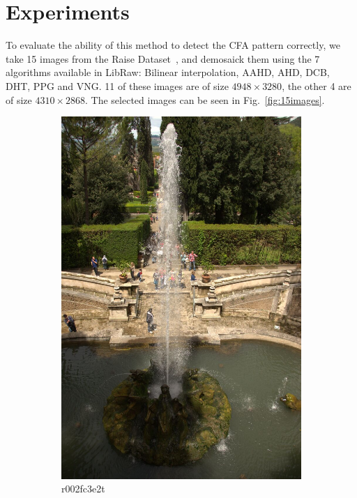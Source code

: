 \documentclass{ipol}
\begin{document}
\clearpage


\iffalse

\section{Experiments}
To evaluate the ability of this method to detect the CFA pattern correctly, we take 15 images from the Raise Dataset~\cite{raise}, and demosaick them using the 7 algorithms available in LibRaw: Bilinear interpolation, AAHD, AHD, DCB, DHT, PPG and VNG. 11 of these images are of size $4948\times3280$, the other 4 are of size $4310\times2868$. The selected images can be seen in Fig.~\ref{fig:15images}.

\begin{figure}[ht]
    \centering
    \begin{subfigure}[c]{.31\linewidth}\centering
    \includegraphics[height=\linewidth]{images/original/r002fc3e2t.jpeg}
    \caption{r002fc3e2t}
    \end{subfigure}\hfill%
    \begin{subfigure}[c]{.31\linewidth}\centering

\end{subfigure}
\end{figure}
\end{document}
